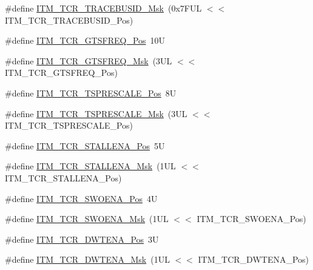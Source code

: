 \begin{DoxyCompactItemize}
\#define \hyperlink{group___c_m_s_i_s___i_t_m_gac014c7345304ed245b642eb9d6e9a302}{I\+T\+M\+\_\+\+T\+C\+R\+\_\+\+T\+R\+A\+C\+E\+B\+U\+S\+I\+D\+\_\+\+Msk}~(0x7\+F\+U\+L $<$$<$ I\+T\+M\+\_\+\+T\+C\+R\+\_\+\+T\+R\+A\+C\+E\+B\+U\+S\+I\+D\+\_\+\+Pos)
\item 
\#define \hyperlink{group___c_m_s_i_s___i_t_m_ga96c7c7cbc0d98426c408090b41f583f1}{I\+T\+M\+\_\+\+T\+C\+R\+\_\+\+G\+T\+S\+F\+R\+E\+Q\+\_\+\+Pos}~10U
\item 
\#define \hyperlink{group___c_m_s_i_s___i_t_m_gade862cf009827f7f6748fc44c541b067}{I\+T\+M\+\_\+\+T\+C\+R\+\_\+\+G\+T\+S\+F\+R\+E\+Q\+\_\+\+Msk}~(3\+U\+L $<$$<$ I\+T\+M\+\_\+\+T\+C\+R\+\_\+\+G\+T\+S\+F\+R\+E\+Q\+\_\+\+Pos)
\item 
\#define \hyperlink{group___c_m_s_i_s___i_t_m_gaa39e93e22d56e5e9edaf866b1171ac4f}{I\+T\+M\+\_\+\+T\+C\+R\+\_\+\+T\+S\+P\+R\+E\+S\+C\+A\+L\+E\+\_\+\+Pos}~8U
\item 
\#define \hyperlink{group___c_m_s_i_s___i_t_m_ga3e8651ecde89295bcc6e248a1b7393d6}{I\+T\+M\+\_\+\+T\+C\+R\+\_\+\+T\+S\+P\+R\+E\+S\+C\+A\+L\+E\+\_\+\+Msk}~(3\+U\+L $<$$<$ I\+T\+M\+\_\+\+T\+C\+R\+\_\+\+T\+S\+P\+R\+E\+S\+C\+A\+L\+E\+\_\+\+Pos)
\item 
\#define \hyperlink{group___c_m_s_i_s___i_t_m_gad74ca6140644b572eadbf21e870d24b9}{I\+T\+M\+\_\+\+T\+C\+R\+\_\+\+S\+T\+A\+L\+L\+E\+N\+A\+\_\+\+Pos}~5U
\item 
\#define \hyperlink{group___c_m_s_i_s___i_t_m_ga724f0560593042670b49e2f9a6483b6f}{I\+T\+M\+\_\+\+T\+C\+R\+\_\+\+S\+T\+A\+L\+L\+E\+N\+A\+\_\+\+Msk}~(1\+U\+L $<$$<$ I\+T\+M\+\_\+\+T\+C\+R\+\_\+\+S\+T\+A\+L\+L\+E\+N\+A\+\_\+\+Pos)
\item 
\#define \hyperlink{group___c_m_s_i_s___i_t_m_ga7a380f0c8078f6560051406583ecd6a5}{I\+T\+M\+\_\+\+T\+C\+R\+\_\+\+S\+W\+O\+E\+N\+A\+\_\+\+Pos}~4U
\item 
\#define \hyperlink{group___c_m_s_i_s___i_t_m_ga97476cb65bab16a328b35f81fd02010a}{I\+T\+M\+\_\+\+T\+C\+R\+\_\+\+S\+W\+O\+E\+N\+A\+\_\+\+Msk}~(1\+U\+L $<$$<$ I\+T\+M\+\_\+\+T\+C\+R\+\_\+\+S\+W\+O\+E\+N\+A\+\_\+\+Pos)
\item 
\#define \hyperlink{group___c_m_s_i_s___i_t_m_ga30e83ebb33aa766070fe3d1f27ae820e}{I\+T\+M\+\_\+\+T\+C\+R\+\_\+\+D\+W\+T\+E\+N\+A\+\_\+\+Pos}~3U
\item 
\#define \hyperlink{group___c_m_s_i_s___i_t_m_ga98ea1c596d43d3633a202f9ee746cf70}{I\+T\+M\+\_\+\+T\+C\+R\+\_\+\+D\+W\+T\+E\+N\+A\+\_\+\+Msk}~(1\+U\+L $<$$<$ I\+T\+M\+\_\+\+T\+C\+R\+\_\+\+D\+W\+T\+E\+N\+A\+\_\+\+Pos)
\item 

\end{DoxyCompactItemize}
